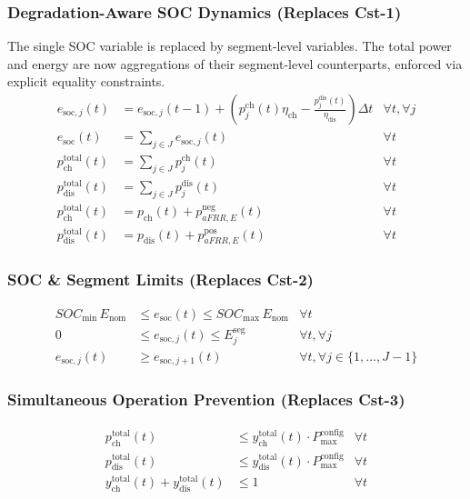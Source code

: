 \documentclass[11pt, a4paper]{article}
\begin{document}
\subsubsection{Degradation-Aware SOC Dynamics (Replaces Cst-1)}
The single SOC variable is replaced by segment-level variables. The total power and energy are now aggregations of their segment-level counterparts, enforced via explicit equality constraints.
\begin{align}
e_{\mathrm{soc},j}(t) &= e_{\mathrm{soc},j}(t-1) + \left( p^{\mathrm{ch}}_{j}(t) \eta_{\mathrm{ch}} - \frac{p^{\mathrm{dis}}_{j}(t)}{\eta_{\mathrm{dis}}} \right) \Delta t & \forall t, \forall j \label{eq:seg_soc_balance}\\
e_{\mathrm{soc}}(t) &= \sum_{j \in J} e_{\mathrm{soc},j}(t) & \forall t \label{eq:total_soc_agg}\\
p^{\mathrm{total}}_{\mathrm{ch}}(t) &= \sum_{j \in J} p^{\mathrm{ch}}_{j}(t) & \forall t \label{eq:total_ch_agg_seg}\\
p^{\mathrm{total}}_{\mathrm{dis}}(t) &= \sum_{j \in J} p^{\mathrm{dis}}_{j}(t) & \forall t \label{eq:total_dis_agg_seg}\\
p^{\mathrm{total}}_{\mathrm{ch}}(t) &= p_{\mathrm{ch}}(t) + p^{\mathrm{neg}}_{aFRR,E}(t) & \forall t \label{eq:total_ch_agg_market}\\
p^{\mathrm{total}}_{\mathrm{dis}}(t) &= p_{\mathrm{dis}}(t) + p^{\mathrm{pos}}_{aFRR,E}(t) & \forall t \label{eq:total_dis_agg_market}
\end{align}

\subsubsection{SOC \& Segment Limits (Replaces Cst-2)}
\begin{align}
SOC_{\min}\,E_{\mathrm{nom}} &\le e_{\mathrm{soc}}(t) \le SOC_{\max}\,E_{\mathrm{nom}} & \forall t \\
0 &\le e_{\mathrm{soc},j}(t) \le E^{\mathrm{seg}}_{j} & \forall t, \forall j \\
e_{\mathrm{soc},j}(t) &\ge e_{\mathrm{soc},j+1}(t) & \forall t, \forall j \in \{1, ..., J-1\}
\end{align}

\subsubsection{Simultaneous Operation Prevention (Replaces Cst-3)}
\begin{align}
p^{\mathrm{total}}_{\mathrm{ch}}(t) &\le y^{\mathrm{total}}_{\mathrm{ch}}(t) \cdot P^{\mathrm{config}}_{\max} & \forall t \\
p^{\mathrm{total}}_{\mathrm{dis}}(t) &\le y^{\mathrm{total}}_{\mathrm{dis}}(t) \cdot P^{\mathrm{config}}_{\max} & \forall t \\
y^{\mathrm{total}}_{\mathrm{ch}}(t) + y^{\mathrm{total}}_{\mathrm{dis}}(t) &\le 1 & \forall t
\end{align}
\end{document}
